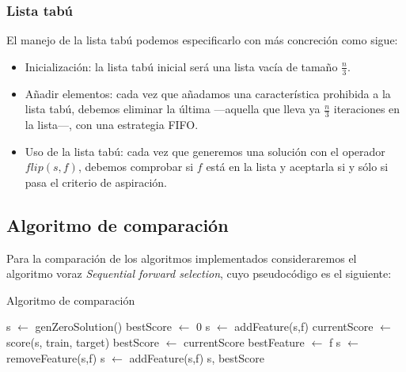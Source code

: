 \documentclass[a4paper, 11pt, titlepage]{article}
\begin{document}
    \subsubsection*{Lista tabú}

    El manejo de la lista tabú podemos especificarlo con más concreción como sigue:
    \begin{itemize}
        \item Inicialización: la lista tabú inicial será una lista vacía de tamaño $\frac{n}{3}$.
        \item Añadir elementos: cada vez que añadamos una característica prohibida a la lista tabú, debemos eliminar la última ---aquella que lleva ya $\frac{n}{3}$ iteraciones en la lista---, con una estrategia FIFO.
        \item Uso de la lista tabú: cada vez que generemos una solución con el operador $flip(s,f)$, debemos comprobar si $f$ está en la lista y aceptarla si y sólo si pasa el criterio de aspiración.
    \end{itemize}

    \subsection{Algoritmo de comparación}

    Para la comparación de los algoritmos implementados consideraremos el algoritmo voraz \emph{Sequential forward selection}, cuyo pseudocódigo es el siguiente:

    \begin{algorithm}
        \caption{Algoritmo de comparación}\label{enfSimul}
        \begin{algorithmic}[1]
            \State s $\gets$ genZeroSolution()
            \State bestScore $\gets$ 0
                    \State s $\gets$ addFeature(s,f)
                    \State currentScore $\gets$ score(s, train, target)
                    \State bestScore $\gets$ currentScore
                    \State bestFeature $\gets$ f
                    \EndIf
                    \State s $\gets$ removeFeature(s,f)
                \EndFor
            \State s $\gets$ addFeature(s,f)
            \EndIf
            \EndWhile
            \State \Return s, bestScore
            \EndFunction
        \end{algorithmic}
    \end{algorithm}
\end{document}
